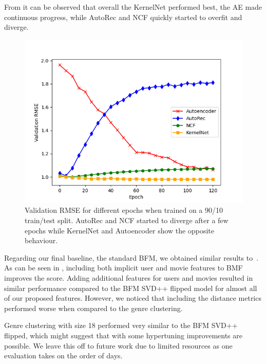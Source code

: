 \documentclass[10pt,conference,compsocconf]{IEEEtran}
\newcommand{\todo}[1]{\textcolor{red}{#1}}
\begin{document}
    From  it can be observed that overall the KernelNet performed best, the AE made continuous progress, while AutoRec and NCF quickly started to overfit and diverge.

    \begin{figure}
        \includegraphics[width=\columnwidth]{figures/validation_plot.png}
        \caption{Validation RMSE for different epochs when trained on a 90/10 train/test split.
        AutoRec and NCF started to diverge after a few epochs while KernelNet and Autoencoder show the opposite behaviour.}
        \label{fig:validation}
    \end{figure}

    Regarding our final baseline, the standard BFM, we obtained similar results to~\cite{rendle_difficulty_2019}.
    As can be seen in , including both implicit user and movie features to BMF improves the score.%
    Adding additional features for users and movies resulted in similar performance compared to the BFM SVD++ flipped model
    for almost all of our proposed features.
    However, we noticed that including the distance metrics performed worse when compared to the genre clustering.%

    Genre clustering with size 18 performed very similar to the BFM SVD++ flipped, which might suggest that with some hypertuning improvements are possible.
    We leave this off to future work due to limited resources as one evaluation takes on the order of days.
\end{document}
